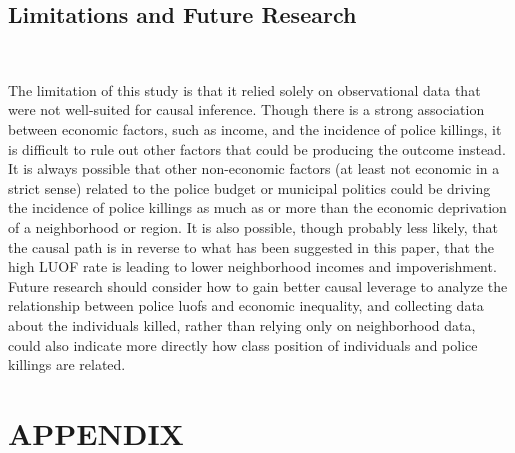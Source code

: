 \documentclass[12pt]{article}
\begin{document}
\subsection{Limitations and Future Research} \

The limitation of this study is that it relied solely on observational data that were not well-suited for causal inference. Though there is a strong association between economic factors, such as income, and the incidence of police killings, it is difficult to rule out other factors that could be producing the outcome instead. It is always possible that other non-economic factors (at least not economic in a strict sense) related to the police budget or municipal politics could be driving the incidence of police killings as much as or more than the economic deprivation of a neighborhood or region. It is also possible, though probably less likely, that the causal path is in reverse to what has been suggested in this paper, that the high LUOF rate is leading to lower neighborhood incomes and impoverishment. Future research should consider how to gain better causal leverage to analyze the relationship between police \acrshort{luof}s and economic inequality, and collecting data about the individuals killed, rather than relying only on neighborhood data, could also indicate more directly how class position of individuals and police killings are related.
\section{APPENDIX}
\end{document}
